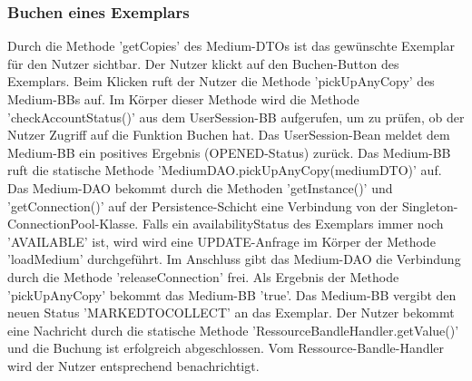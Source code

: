 \documentclass{article}
\begin{document}
\subsubsection{Buchen eines Exemplars}
Durch die Methode 'getCopies' des Medium-DTOs ist das gewünschte Exemplar für den Nutzer sichtbar. Der Nutzer klickt auf den Buchen-Button des Exemplars. Beim Klicken ruft der Nutzer die Methode 'pickUpAnyCopy' des Medium-BBs auf. Im Körper dieser Methode wird die Methode 'checkAccountStatus()' aus dem UserSession-BB aufgerufen, um zu prüfen, ob der Nutzer Zugriff auf die Funktion Buchen hat. Das UserSession-Bean meldet dem Medium-BB ein positives Ergebnis (OPENED-Status) zurück. Das Medium-BB ruft die statische Methode 'MediumDAO.pickUpAnyCopy(mediumDTO)' auf. Das Medium-DAO bekommt durch die Methoden 'getInstance()' und 'getConnection()' auf der Persistence-Schicht eine Verbindung von der Singleton-ConnectionPool-Klasse. Falls ein availabilityStatus des Exemplars immer noch 'AVAILABLE' ist, wird wird eine UPDATE-Anfrage im Körper der Methode 'loadMedium'  durchgeführt. Im Anschluss gibt das Medium-DAO die Verbindung durch die Methode 'releaseConnection' frei. Als Ergebnis der Methode 'pickUpAnyCopy' bekommt das Medium-BB 'true'. Das Medium-BB vergibt den neuen Status 'MARKEDTOCOLLECT' an das Exemplar. Der Nutzer bekommt eine Nachricht durch die statische Methode 'RessourceBandleHandler.getValue()' und die Buchung ist erfolgreich abgeschlossen. Vom Ressource-Bandle-Handler wird der Nutzer entsprechend benachrichtigt.
\newpage
\end{document}
